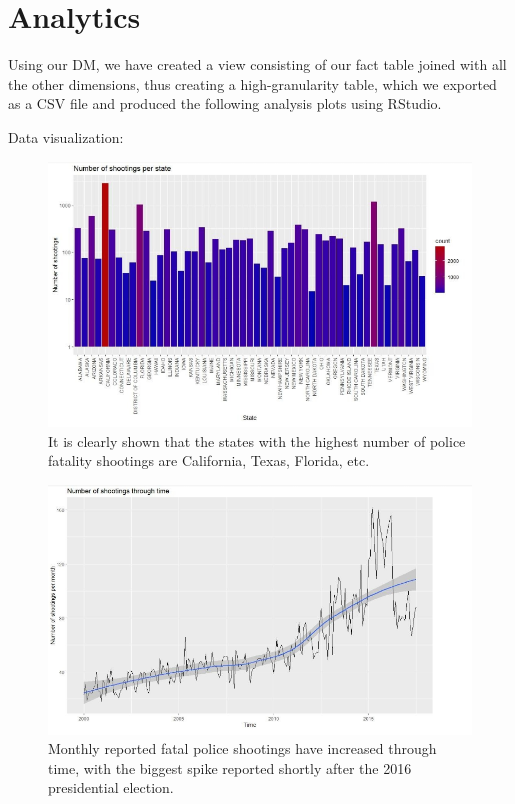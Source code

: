 \documentclass[11pt, journal]{IEEEtran}
\begin{document}
\section{Analytics} \label{sec:analytics}
Using our DM, we have created a view consisting of our fact table joined with all the other dimensions, thus creating a high-granularity table, which we exported as a CSV file and produced the following analysis plots using RStudio.

\vspace{25mm}

Data visualization:

\begin{figure}[htb]
	\centering
		\includegraphics[width=1.0\columnwidth]{images/snapshot4}
	\caption{It is clearly shown that the states with the highest number of police fatality shootings are California, Texas, Florida, etc.}
	\label{fig:probov}
\end{figure}

\vspace{25mm}

\begin{figure}[htb]
	\centering
		\includegraphics[width=1.0\columnwidth]{images/snapshot5}
	\caption{Monthly reported fatal police shootings have increased through time, with the biggest spike reported shortly after the 2016 presidential election.}
	\label{fig:probov}
\end{figure}
\end{document}
